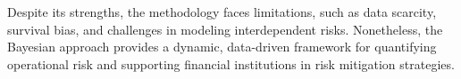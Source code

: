 Despite its strengths, the methodology faces limitations, such as data scarcity, survival bias, and challenges in modeling interdependent risks. Nonetheless, the Bayesian approach provides a dynamic, data-driven framework for quantifying operational risk and supporting financial institutions in risk mitigation strategies.
